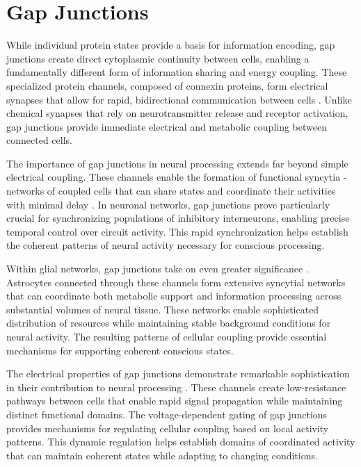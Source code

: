 \section{Gap Junctions}

While individual protein states provide a basis for information encoding, gap junctions create direct cytoplasmic continuity between cells, enabling a fundamentally different form of information sharing and energy coupling. These specialized protein channels, composed of connexin proteins, form electrical synapses that allow for rapid, bidirectional communication between cells \cite{Giaume1996}. Unlike chemical synapses that rely on neurotransmitter release and receptor activation, gap junctions provide immediate electrical and metabolic coupling between connected cells.

The importance of gap junctions in neural processing extends far beyond simple electrical coupling. These channels enable the formation of functional syncytia - networks of coupled cells that can share states and coordinate their activities with minimal delay \cite{Bennett2004}. In neuronal networks, gap junctions prove particularly crucial for synchronizing populations of inhibitory interneurons, enabling precise temporal control over circuit activity. This rapid synchronization helps establish the coherent patterns of neural activity necessary for conscious processing.

Within glial networks, gap junctions take on even greater significance \cite{Dermietzel2013}. Astrocytes connected through these channels form extensive syncytial networks that can coordinate both metabolic support and information processing across substantial volumes of neural tissue. These networks enable sophisticated distribution of resources while maintaining stable background conditions for neural activity. The resulting patterns of cellular coupling provide essential mechanisms for supporting coherent conscious states.

The electrical properties of gap junctions demonstrate remarkable sophistication in their contribution to neural processing \cite{Connors2004}. These channels create low-resistance pathways between cells that enable rapid signal propagation while maintaining distinct functional domains. The voltage-dependent gating of gap junctions provides mechanisms for regulating cellular coupling based on local activity patterns. This dynamic regulation helps establish domains of coordinated activity that can maintain coherent states while adapting to changing conditions.

